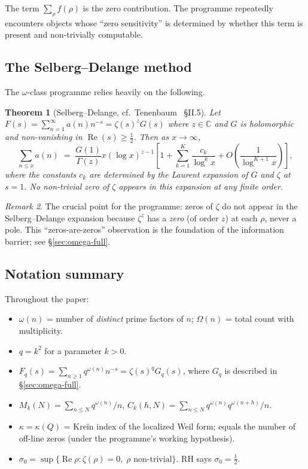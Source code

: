 \documentclass[11pt]{amsart}
\newtheorem{theorem}{Theorem}[section]
\theoremstyle{definition}
\theoremstyle{remark}
\newtheorem{remark}[theorem]{Remark}
\renewcommand{\Re}{\operatorname{Re}}
\newcommand{\half}{\tfrac{1}{2}}
\newcommand{\om}{\omega}
\newcommand{\kap}{\kappa}
\newcommand{\sig}{\sigma}
\begin{document}
The term $\sum_\rho \hat f(\rho)$ is the zero contribution.  The programme repeatedly
encounters objects whose ``zero sensitivity'' is determined by whether this term is
present and non-trivially computable.

\subsection{The Selberg--Delange method}
\label{ss:SD}

The $\om$-class programme relies heavily on the following.

\begin{theorem}[Selberg--Delange, cf.\ Tenenbaum \cite{Ten15}~\S II.5]
\label{thm:SD}
Let $F(s) = \sum_{n=1}^\infty a(n)n^{-s} = \zeta(s)^z G(s)$ where $z\in\mathbb{C}$
and $G$ is holomorphic and non-vanishing in $\Re(s)\ge\half$.  Then as $x\to\infty$,
\[
  \sum_{n\le x} a(n) \;=\;
  \frac{G(1)}{\Gamma(z)} x (\log x)^{z-1}
  \left[ 1 + \sum_{k=1}^K \frac{c_k}{\log^k x} + O\!\left(\frac{1}{\log^{K+1} x}\right)\right],
\]
where the constants $c_k$ are determined by the Laurent expansion of $G$ and $\zeta$
at $s=1$.  No non-trivial zero of $\zeta$ appears in this expansion at any finite order.
\end{theorem}

\begin{remark}
The crucial point for the programme: zeros of $\zeta$ do not appear in the
Selberg--Delange expansion because $\zeta^z$ has a \emph{zero} (of order $z$) at each
$\rho$, never a pole.  This ``zeros-are-zeros'' observation is the foundation of the
information barrier; see \S\ref{sec:omega-full}.
\end{remark}

\subsection{Notation summary}
\label{ss:notation}

Throughout the paper:
\begin{itemize}
\item $\om(n)$ = number of \emph{distinct} prime factors of $n$;
  $\Omega(n)$ = total count with multiplicity.
\item $q = k^2$ for a parameter $k > 0$.
\item $F_q(s) = \sum_{n\ge 1} q^{\om(n)} n^{-s} = \zeta(s)^q G_q(s)$, where
  $G_q$ is described in \S\ref{sec:omega-full}.
\item $M_k(N) = \sum_{n\le N} q^{\om(n)}/n$, $C_k(h,N) = \sum_{n\le N} q^{\om(n)}q^{\om(n+h)}/n$.
\item $\kap = \kap(Q)$ = Kreĭn index of the localized Weil form; equals the number
  of off-line zeros (under the programme's working hypothesis).
\item $\sig_0 = \sup\{\Re\rho : \zeta(\rho)=0,\; \rho \text{ non-trivial}\}$.
  RH says $\sig_0 = \half$.
\end{itemize}
\end{document}
